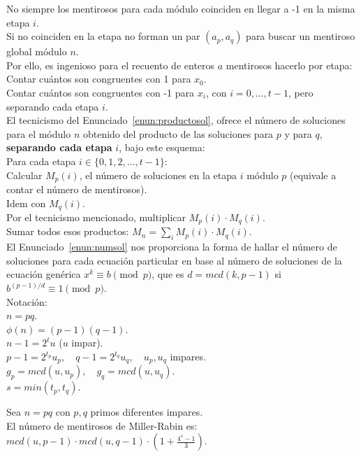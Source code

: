 No siempre los mentirosos para cada módulo coinciden en llegar a -1 en la misma etapa $i$. \\
Si no coinciden en la etapa no forman un par $(a_p,a_q)$ para buscar un mentiroso global módulo $n$. \\
Por ello, es ingenioso para el recuento de enteros $a$ mentirosos hacerlo por etapa: \\
Contar cuántos son congruentes con 1 para $x_0$. \\
Contar cuántos son congruentes con -1 para $x_i$, con $i=0, \dots, t-1$, pero separando cada etapa $i$. \\
El tecnicismo del Enunciado~\ref{enun:productosol}, ofrece el número de soluciones para el módulo $n$ obtenido del producto de las soluciones para $p$ y para $q$, \textbf{separando cada etapa} $i$, bajo este esquema: \\
Para cada etapa $i \in \{0,1,2, \dots,t-1\}$: \\
Calcular $M_p(i)$, el número de soluciones en la etapa $i$ módulo $p$ (equivale a contar el número de mentirosos). \\
Idem con $M_q(i)$. \\
Por el tecnicismo mencionado, multiplicar $M_p(i) \cdot M_q(i)$. \\
Sumar todos esos productos: $M_n = \sum_i M_p(i) \cdot M_q(i)$. \\

El Enunciado~\ref{enun:numsol} nos proporciona la forma de hallar el número de soluciones para cada ecuación particular en base al número de soluciones de la ecuación genérica $x^k \equiv b \pmod p$, que es $d=mcd(k,p-1)$ si $b^{(p-1)/d} \equiv 1 \pmod p$. \\

Notación: \\
$n=pq$. \\
$\phi(n) = (p-1)(q-1)$. \\
$n-1=2^tu$ ($u$ impar). \\
$p-1 = 2^{t_p}u_p,\quad q-1=2^{t_q}u_q,\quad u_p,u_q$ impares. \\
$g_p = mcd(u,u_p),\quad g_q = mcd(u,u_q)$. \\
$s = min(t_p,t_q)$. 

\begin{enunciado} [Número de mentirosos caso $n=pq$]\label{enun:nummentirosos}\leavevmode\par 
Sea $n=pq$ con $p,q$ primos diferentes impares. \\
El número de mentirosos de Miller-Rabin es: \\
$mcd(u,p-1) \cdot mcd(u,q-1) \cdot \left(1 + \frac{4^s - 1}{3}\right)$.
\end{enunciado}

